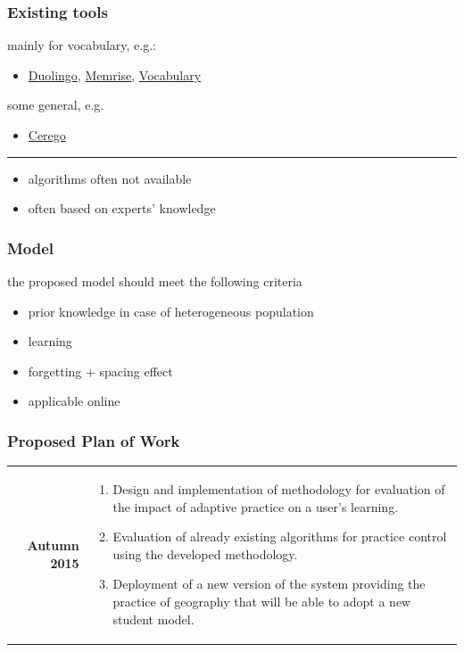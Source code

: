 \documentclass[xcolor=svgnames]{beamer}
\begin{document}
\begin{frame}
\end{frame}
\begin{frame}
	\frametitle{Existing tools}
	mainly for vocabulary, e.g.:
	\begin{itemize}
		\item \href{http://duolingo.com}{Duolingo}, \href{http://memrise.com}{Memrise}, \href{http://vocabulary.com}{Vocabulary}
	\end{itemize}
	some general, e.g.
	\begin{itemize}
		\item \href{http://cerego.com}{Cerego}
	\end{itemize}

	\bigskip
	\hrule

	\bigskip
	\begin{itemize}
		\item algorithms often not available
		\item often based on experts' knowledge
	\end{itemize}
\end{frame}
\begin{frame}
	\frametitle{Model}
	the proposed model should meet the following criteria
	\begin{itemize}
		\item prior knowledge in case of heterogeneous population
		\item learning
		\item forgetting + spacing effect
		\item applicable online
	\end{itemize}
\end{frame}
\begin{frame}
\frametitle{Proposed Plan of Work}
\begin{tabularx}{\textwidth}{rX}
	\textbf{Autumn 2015} &
		\vspace{-0.5cm}
		\begin{enumerate}
			\item Design and implementation of methodology for evaluation of the impact
				of adaptive practice on a user's learning.
			\item Evaluation of already existing algorithms for practice control using the
				developed methodology.
			\item Deployment of a new version of the system providing the practice of
				geography that will be able to adopt a new student model.
		\end{enumerate}
\end{tabularx}
\end{frame}
\end{document}
